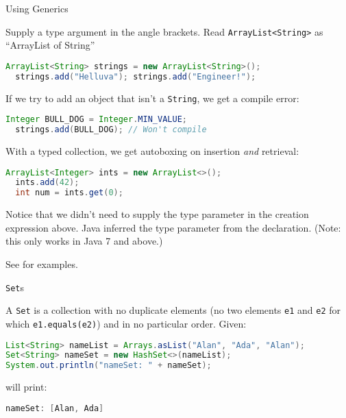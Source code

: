 \documentclass{beamer}
\begin{document}
\begin{frame}[fragile]{Using Generics}


Supply a type argument in the angle brackets.  Read {\tt ArrayList<String>} as ``ArrayList of String''
\begin{lstlisting}[language=Java]
  ArrayList<String> strings = new ArrayList<String>();
  strings.add("Helluva"); strings.add("Engineer!");
\end{lstlisting}
If we try to add an object that isn't a {\tt String}, we get a compile error:
\begin{lstlisting}[language=Java]
  Integer BULL_DOG = Integer.MIN_VALUE;
  strings.add(BULL_DOG); // Won't compile
\end{lstlisting}

With a typed collection, we get autoboxing on insertion {\it and} retrieval:

\begin{lstlisting}[language=Java]
  ArrayList<Integer> ints = new ArrayList<>();
  ints.add(42);
  int num = ints.get(0);
\end{lstlisting}
Notice that we didn't need to supply the type parameter in the creation expression above.  Java inferred the type parameter from the declaration. (Note: this only works in Java 7 and above.)

See  for examples.

\end{frame}

\begin{frame}[fragile]{{\tt Set}s}

A {\tt Set} is a collection with no duplicate elements (no two elements {\tt e1} and {\tt e2} for which {\tt e1.equals(e2)}) and in no particular order.  Given:
\begin{lstlisting}[language=Java]
List<String> nameList = Arrays.asList("Alan", "Ada", "Alan");
Set<String> nameSet = new HashSet<>(nameList);
System.out.println("nameSet: " + nameSet);
\end{lstlisting}
will print:
\begin{lstlisting}[language=Java]
nameSet: [Alan, Ada]
\end{lstlisting}

\end{frame}
\end{document}

